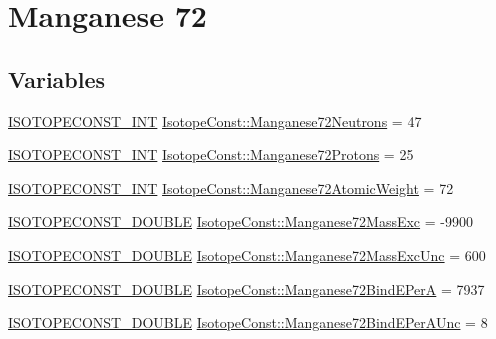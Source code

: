 \hypertarget{group___isotope_const-_manganese-_mn72}{}\section{Manganese 72}
\label{group___isotope_const-_manganese-_mn72}
\subsection*{Variables}
\begin{DoxyCompactItemize}
\item 
\mbox{\hyperlink{group___isotope_const-_macros_ga5f18360b3e99483a35c32d789e62621c}{I\+S\+O\+T\+O\+P\+E\+C\+O\+N\+S\+T\+\_\+\+I\+NT}} \mbox{\hyperlink{group___isotope_const-_manganese-_mn72_ga31aaeadc618353579cc2f4ed4ca84b0f}{Isotope\+Const\+::\+Manganese72\+Neutrons}} = 47
\item 
\mbox{\hyperlink{group___isotope_const-_macros_ga5f18360b3e99483a35c32d789e62621c}{I\+S\+O\+T\+O\+P\+E\+C\+O\+N\+S\+T\+\_\+\+I\+NT}} \mbox{\hyperlink{group___isotope_const-_manganese-_mn72_ga1c800ec88b596ddff64d82cc15496730}{Isotope\+Const\+::\+Manganese72\+Protons}} = 25
\item 
\mbox{\hyperlink{group___isotope_const-_macros_ga5f18360b3e99483a35c32d789e62621c}{I\+S\+O\+T\+O\+P\+E\+C\+O\+N\+S\+T\+\_\+\+I\+NT}} \mbox{\hyperlink{group___isotope_const-_manganese-_mn72_ga1e1c91fea9f816c545f55ed500862f55}{Isotope\+Const\+::\+Manganese72\+Atomic\+Weight}} = 72
\item 
\mbox{\hyperlink{group___isotope_const-_macros_ga8f45a7272ce02c0b4c65c44636ed719a}{I\+S\+O\+T\+O\+P\+E\+C\+O\+N\+S\+T\+\_\+\+D\+O\+U\+B\+LE}} \mbox{\hyperlink{group___isotope_const-_manganese-_mn72_ga3e0d733f6a6243f8ca2ef3ab595a2cff}{Isotope\+Const\+::\+Manganese72\+Mass\+Exc}} = -\/9900
\item 
\mbox{\hyperlink{group___isotope_const-_macros_ga8f45a7272ce02c0b4c65c44636ed719a}{I\+S\+O\+T\+O\+P\+E\+C\+O\+N\+S\+T\+\_\+\+D\+O\+U\+B\+LE}} \mbox{\hyperlink{group___isotope_const-_manganese-_mn72_gadd4fc7dafa163a63ed595969a5f406d1}{Isotope\+Const\+::\+Manganese72\+Mass\+Exc\+Unc}} = 600
\item 
\mbox{\hyperlink{group___isotope_const-_macros_ga8f45a7272ce02c0b4c65c44636ed719a}{I\+S\+O\+T\+O\+P\+E\+C\+O\+N\+S\+T\+\_\+\+D\+O\+U\+B\+LE}} \mbox{\hyperlink{group___isotope_const-_manganese-_mn72_ga82dae76712289c4253542c70638098f1}{Isotope\+Const\+::\+Manganese72\+Bind\+E\+PerA}} = 7937
\item 
\mbox{\hyperlink{group___isotope_const-_macros_ga8f45a7272ce02c0b4c65c44636ed719a}{I\+S\+O\+T\+O\+P\+E\+C\+O\+N\+S\+T\+\_\+\+D\+O\+U\+B\+LE}} \mbox{\hyperlink{group___isotope_const-_manganese-_mn72_gab7d4c9c2a40098c5dabe3c2e6b3a3851}{Isotope\+Const\+::\+Manganese72\+Bind\+E\+Per\+A\+Unc}} = 8

\end{DoxyCompactItemize}
